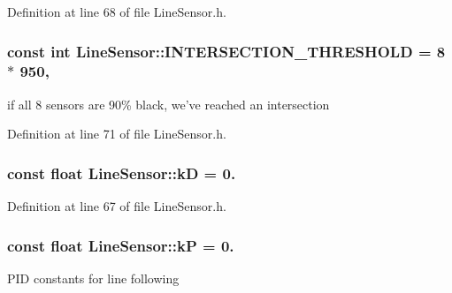 Definition at line 68 of file Line\-Sensor.\-h.

\hypertarget{classLineSensor_a55b9f63bd4c01990f6f2d7baa830d2ec}{
\subsubsection[{I\-N\-T\-E\-R\-S\-E\-C\-T\-I\-O\-N\-\_\-\-T\-H\-R\-E\-S\-H\-O\-L\-D}]{\setlength{\rightskip}{0pt plus 5cm}const int Line\-Sensor\-::\-I\-N\-T\-E\-R\-S\-E\-C\-T\-I\-O\-N\-\_\-\-T\-H\-R\-E\-S\-H\-O\-L\-D = 8 $\ast$ 950\hspace{0.3cm}{\ttfamily [static]}, {\ttfamily [private]}}}\label{classLineSensor_a55b9f63bd4c01990f6f2d7baa830d2ec}


if all 8 sensors are 90\% black, we've reached an intersection 



Definition at line 71 of file Line\-Sensor.\-h.

\hypertarget{classLineSensor_a62c587ff3d58f72a74ae39429b7d0837}{
\subsubsection[{k\-D}]{\setlength{\rightskip}{0pt plus 5cm}const float Line\-Sensor\-::k\-D = 0.\hspace{0.3cm}{\ttfamily [private]}}}\label{classLineSensor_a62c587ff3d58f72a74ae39429b7d0837}


Definition at line 67 of file Line\-Sensor.\-h.

\hypertarget{classLineSensor_af246497cb5a3386afcc4ce864949c57f}{
\subsubsection[{k\-P}]{\setlength{\rightskip}{0pt plus 5cm}const float Line\-Sensor\-::k\-P = 0.\hspace{0.3cm}{\ttfamily [private]}}}\label{classLineSensor_af246497cb5a3386afcc4ce864949c57f}
P\-I\-D constants for line following 

